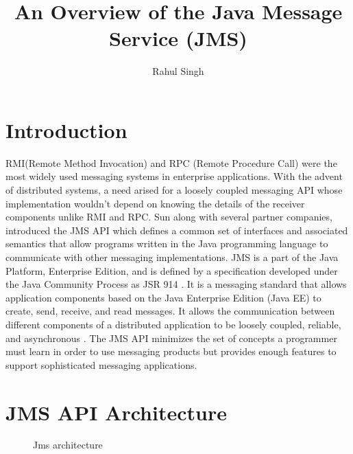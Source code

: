 \documentclass[9pt,twocolumn,twoside]{styles/osajnl}
\title{An Overview of the Java Message Service (JMS)}
\author[1]{Rahul Singh}
\affil[1]{School of Informatics and Computing, Bloomington, IN 47408, U.S.A.}
\affil[*]{Corresponding authors: rahpsing@iu.edu}
\begin{document}
\maketitle

\section{Introduction}

RMI(Remote Method Invocation) and RPC (Remote Procedure Call) were the
most widely used messaging systems in enterprise applications. With
the advent of distributed systems, a need arised for a loosely coupled
messaging API whose implementation wouldn't depend on knowing the
details of the receiver components unlike RMI and RPC. Sun along with
several partner companies, introduced the JMS API which defines a
common set of interfaces and associated semantics that allow programs
written in the Java programming language to communicate with other
messaging implementations. JMS is a part of the Java Platform,
Enterprise Edition, and is defined by a specification developed under
the Java Community Process as JSR 914 \cite{www-jms-javajsr}.  It is a
messaging standard that allows application components based on the
Java Enterprise Edition (Java EE) to create, send, receive, and read
messages. It allows the communication between different components of
a distributed application to be loosely coupled, reliable, and
asynchronous \cite{www-jms-oracle}. The JMS API minimizes the set of
concepts a programmer must learn in order to use messaging products
but provides enough features to support sophisticated messaging
applications.

\section{JMS API Architecture}

\begin{figure}[htbp]
\centering
{}
\caption{\cite{www-jms-tutorialoracle} Jms architecture}
\label{fig:JMS Objects}
\end{figure}
\end{document}
